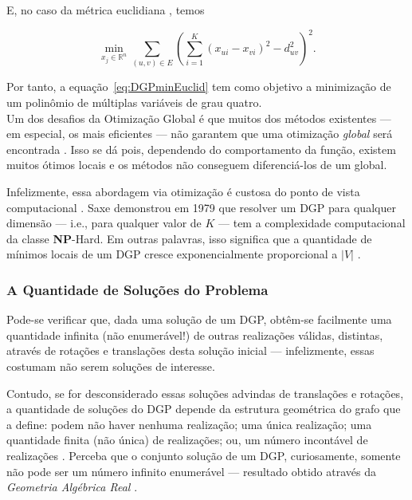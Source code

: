 \documentclass[a4paper,12pt]{article}
\begin{document}
E, no caso da métrica euclidiana \cite{libertiEDG}, temos

\begin{equation}
 \min_{x_j \in \mathbb{R}^n} \sum_{(u,v)\in E} \left(\sum_{i=1}^{K}(x_{ui} - x_{vi})^2 - d_{uv}^2\right)^2.
 \label{eq:DGPminEuclid}
\end{equation}

Por tanto, a equação~\ref{eq:DGPminEuclid} tem como objetivo a minimização de um polinômio de múltiplas variáveis de grau quatro. 
\\

Um dos desafios da Otimização Global é que muitos dos métodos existentes --- em especial, os mais eficientes --- não garantem que uma otimização \textit{global} será encontrada \cite{libertiEDG}. Isso se dá pois, dependendo do comportamento da função, existem muitos ótimos locais e os métodos não conseguem diferenciá-los de um global. %

Infelizmente, essa abordagem via otimização é custosa do ponto de vista computacional \cite{libertiEDG}. Saxe demonstrou em 1979 \cite{Saxe:79} que resolver um DGP para qualquer dimensão --- i.e., para qualquer valor de $K$ --- tem a complexidade computacional da classe \textbf{NP}-Hard. Em outras palavras, isso significa que a quantidade de mínimos locais de um DGP cresce exponencialmente proporcional a $|V|$ \cite{carlileIntroductionMDGP}. 

\subsubsection{A Quantidade de Soluções do Problema}
Pode-se verificar que, dada uma solução de um DGP, obtêm-se facilmente uma quantidade infinita (não enumerável!) de outras realizações válidas, distintas, através de rotações e translações desta solução inicial \cite{carlileBook31Coloquio} --- infelizmente, essas costumam não serem soluções de interesse.

Contudo, se for desconsiderado essas soluções advindas de translações e rotações, a quantidade de soluções do DGP depende da estrutura geométrica do grafo que a define: podem não haver nenhuma realização; uma única realização; uma quantidade finita (não única) de realizações; ou, um número incontável de realizações \cite{libertiEDG}. Perceba que o conjunto solução de um DGP, curiosamente, somente não pode ser um número infinito enumerável --- resultado obtido através da \textit{Geometria Algébrica Real} \cite{benedettireal}.\\
 
\end{document}
